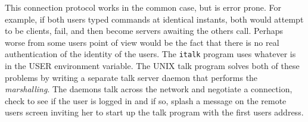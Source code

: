 
This connection protocol works in the common case, but is error prone.
For example, if both users typed commands at identical instants, both
would attempt to be clients, fail, and then become servers awaiting the
other{\textquotesingle}s call. Perhaps worse from some
users{\textquotesingle} point of view would be the fact that there is
no real authentication of the identity of the users. The \texttt{italk}
program uses whatever is in the USER environment variable. The UNIX talk program solves both
of these problems by writing a separate talk server daemon that
performs the \textit{marshalling}. The daemons talk across the network
and negotiate a connection, check to see if the user is logged in and
if so, splash a message on the remote user{\textquotesingle}s screen
inviting her to start up the talk program with the first
user{\textquotesingle}s address.

